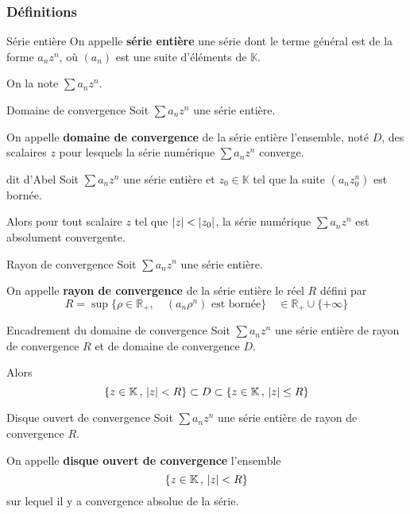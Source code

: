     \subsubsection{Définitions}

    \begin{defi}{Série entière}{}
        On appelle \textbf{série entière} une série dont le terme général est de la forme $a_n z^n$, où $(a_n)$ est une suite d’éléments de $\mathbb{K}$.

        On la note $\sum a_n z^n$.
    \end{defi}

    \begin{defi}{Domaine de convergence}{}
        Soit $\sum a_n z^n$ une série entière.

        On appelle \textbf{domaine de convergence} de la série entière l’ensemble, noté $D$, des scalaires $z$ pour lesquels la série numérique $\sum a_n z^n$ converge.
    \end{defi}

    \begin{lem}{dit d’Abel}{}
        Soit $\sum a_n z^n$ une série entière et $z_0 \in \mathbb{K}$ tel que la suite $(a_n z_0^n)$ est bornée. 

        Alors pour tout scalaire $z$ tel que $\left\lvert z\right\rvert < \left\lvert z_0\right\rvert$, la série numérique $\sum a_n z^n$ est absolument convergente.
    \end{lem}

    \begin{defi}{Rayon de convergence}{}
        Soit $\sum a_n z^n$ une série entière.

        On appelle \textbf{rayon de convergence} de la série entière le réel $R$ défini par 
        \[ R = \sup \big\{ \rho \in \mathbb{R}_+,\quad (a_n \rho^n) \text{ est bornée} \big\} \quad \in \mathbb{R}_+ \cup \{ +\infty \} \]
    \end{defi}

    \begin{prop}{Encadrement du domaine de convergence}{}
        Soit $\sum a_n z^n$ une série entière de rayon de convergence $R$ et de domaine de convergence $D$.

        Alors 
        \[ \left\{ z \in \mathbb{K} \, , \, \left\lvert z\right\rvert < R \right\} \subset D \subset \left\{ z \in \mathbb{K} \, , \, \left\lvert z\right\rvert \leq R \right\} \]
    \end{prop}

    \begin{defi}{Disque ouvert de convergence}{}
        Soit $\sum a_n z^n$ une série entière de rayon de convergence $R$.

        On appelle \textbf{disque ouvert de convergence} l’ensemble 
        \[ \left\{ z \in \mathbb{K} \, , \, \left\lvert z\right\rvert < R \right\} \] 
        sur lequel il y a convergence absolue de la série.
    \end{defi}

